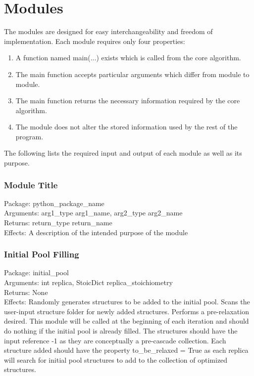 \section{Modules}
		The modules are designed for easy interchangeability and freedom of implementation. Each module requires only four properties: 
		\begin{enumerate}
		\item A function named main(...) exists which is called from the core algorithm.  
		\item The main function accepts particular arguments which differ from module to module. 
		\item The main function returns the necessary information required by the core algorithm. 
		\item The module does not alter the stored information used by the rest of the program.
		\end{enumerate}
		The following lists the required input and output of each module as well as its purpose.

		\subsubsection{Module Title}  \vspace{-\baselineskip}
		Package: python\_package\_name\\
		Arguments: arg1\_type arg1\_name, arg2\_type arg2\_name\\
		Returns: return\_type return\_name\\
		Effects: A description of the intended purpose of the module\\

		\subsubsection{Initial Pool Filling} \vspace{-\baselineskip}
		Package: initial\_pool\\
		Arguments: int replica, StoicDict replica\_stoichiometry\\
		Returns: None\\
		Effects: Randomly generates structures to be added to the initial pool. Scans the user-input structure folder for newly added structures. Performs a pre-relaxation desired. This module will be called at the beginning of each iteration and should do nothing if the initial pool is already filled. The structures should have the input reference -1 as they are conceptually a pre-cascade collection. Each structure added should have the property to\_be\_relaxed = True as each replica will search for initial pool structures to add to the collection of optimized structures. 

